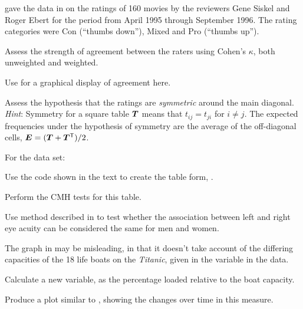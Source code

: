 \documentclass[10pt,krantz2]{krantz}\usepackage[]{graphicx}\usepackage[]{color}
\begin{document}
\begin{Exercises}
  \exercise \citet{AgrestiWinner:1997} gave the data in  on the
  ratings of 160 movies by the reviewers Gene Siskel and Roger Ebert for the period
  from April 1995 through September 1996. The rating categories were Con (``thumbs down''),
  Mixed and Pro (``thumbs up'').

    \begin{enumerate*}
      \item Assess the strength of agreement between the raters using Cohen's
      $\kappa$, both unweighted and weighted.
      \item Use  for a graphical display of agreement here.
      \item Assess the hypothesis that the ratings are \emph{symmetric} around the
      main diagonal.
      \emph{Hint}:  Symmetry for a square table $\bm{T}$ means that $t_{ij} = t_{ji}$
      for $i \ne j$.  The expected frequencies under the hypothesis of symmetry
      are the average of the off-diagonal cells,
      $\bm{E} = (\bm{T} + \bm{T}^\mathsf{T}) / 2$.
    \end{enumerate*}

  \exercise For the  data set:
    \begin{enumerate*}
      \item Use the code shown in the text to create the table form, .
      \item Perform the CMH tests for this table.
      \item Use  method described in  to
      test whether the association between left and right eye acuity can be
      considered the same for men and women.
    \end{enumerate*}

  \exercise The graph in  may be misleading, in that it doesn't
  take account of the differing capacities of the 18 life boats on the
  \emph{Titanic}, given in the variable  in the  data.
    \begin{enumerate*}
      \item Calculate a new variable,  as the percentage
      loaded relative to the boat capacity.
      \item Produce a plot similar to , showing the
      changes over time in this measure.
    \end{enumerate*}

\end{Exercises}
\end{document}

